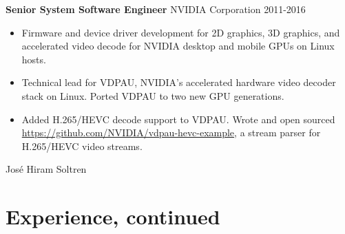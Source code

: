 \textbf{Senior System Software Engineer} NVIDIA Corporation \hfill 2011-2016

\begin{itemize} \itemsep -2pt

\item Firmware and device driver development for 2D
      graphics, 3D graphics, and accelerated video decode for NVIDIA
      desktop and mobile GPUs on Linux hosts.

\item Technical lead for VDPAU, NVIDIA's accelerated hardware video decoder
      stack on Linux. Ported VDPAU to two new GPU generations.

\item Added H.265/HEVC decode support to VDPAU. Wrote and open sourced
      \url{https://github.com/NVIDIA/vdpau-hevc-example}, a stream parser
      for H.265/HEVC video streams.

\end{itemize}

\newpage

{ \sffamily Jos\'e Hiram Soltren}

\section{Experience, continued}

